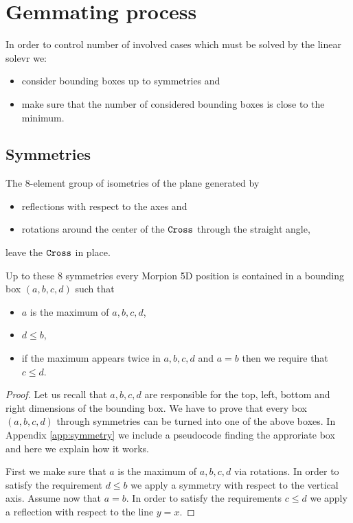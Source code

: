 \section{Gemmating process}
\label{sec:gemmating}

In order to control number of involved cases which must be solved by the linear solevr 
we:\begin{itemize}
\item consider bounding boxes up to symmetries and 
\item make sure that the number of considered bounding boxes is close to the minimum.
\end{itemize}

\subsection{Symmetries}
\label{subsec:symmetries}
The $8$-element group of isometries of the plane generated by 
\begin{itemize}
\item reflections with respect to the axes and 
\item rotations around the center of the $\texttt{Cross}$ through the straight angle,
\end{itemize}
leave the $\texttt{Cross}$ in place. 
\begin{lemma}
Up to these $8$ symmetries every Morpion 5D position is contained in a bounding box $(a,b,c,d)$ such that
\begin{itemize}
\item $a$ is the maximum of $a,b,c,d$,
\item $d\leq b$,
\item if the maximum appears twice in $a,b,c,d$ and $a=b$ then we require that $c\leq d$. 
\end{itemize}
\end{lemma}

\begin{proof}
Let us recall that $a,b,c,d$ are responsible for the top, left, bottom and right dimensions of the bounding box. 
We have to prove that every box $(a,b,c,d)$ through symmetries can be turned into one of the above boxes. 
In Appendix \ref{app:symmetry} we include a pseudocode finding the approriate box and here we explain how it works. 

First we make sure that $a$ is the maximum 
of $a,b,c,d$ via rotations. In order to satisfy the requirement $d\leq b$ we apply a symmetry with respect to the vertical axis. 
Assume now that $a=b$. In order to satisfy the requirements  $c\leq d$ we apply a  reflection with respect to the line $y=x$.
\end{proof}


